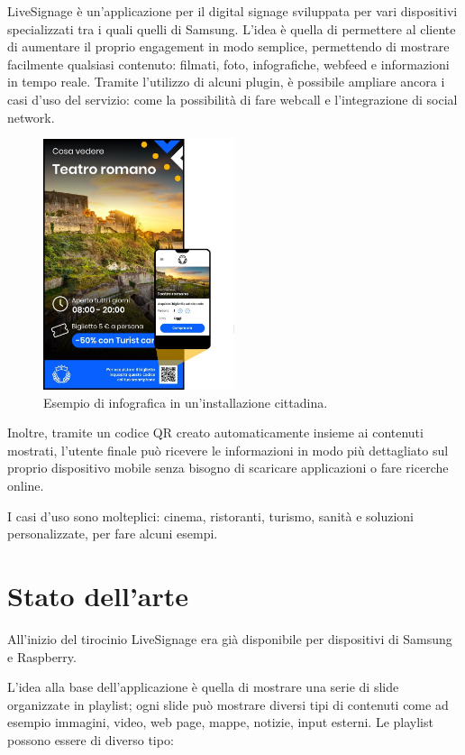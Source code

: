 LiveSignage è un’applicazione per il digital signage sviluppata per vari dispositivi specializzati tra i quali quelli di Samsung. L’idea è quella di permettere al cliente di aumentare il proprio engagement in modo semplice, permettendo di mostrare facilmente qualsiasi contenuto: filmati, foto, infografiche, webfeed e informazioni in tempo reale. Tramite l'utilizzo di alcuni plugin, è possibile ampliare ancora i casi d'uso del servizio: come la possibilità di fare webcall e l'integrazione di social network.

\begin{figure}[!htb]
    \centering
    \includegraphics[width= 0.5\textwidth]{images/Introduzione/LiveTurist.jpg} 
    \caption{Esempio di infografica in un'installazione cittadina.} 
\end{figure}

Inoltre, tramite un codice QR creato automaticamente insieme ai contenuti mostrati, l'utente finale può ricevere le informazioni in modo più dettagliato sul proprio dispositivo mobile senza bisogno di scaricare applicazioni o fare ricerche online.

I casi d'uso sono molteplici: cinema, ristoranti, turismo, sanità e soluzioni personalizzate, per fare alcuni esempi.

\section{Stato dell'arte}

All'inizio del tirocinio LiveSignage era già disponibile per dispositivi di Samsung e Raspberry.  

L'idea alla base dell'applicazione è quella di mostrare una serie di slide organizzate in playlist; ogni slide può mostrare diversi tipi di contenuti come ad esempio immagini, video, web page, mappe, notizie, input esterni. Le playlist possono essere di diverso tipo:

